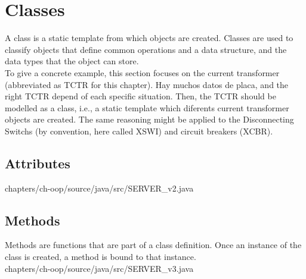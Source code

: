 \section{Classes}

A class is a static 
template from which objects are 
created. Classes are used 
to classify objects  
that define 
common operations 
and a data structure, 
and the data types
that the object can 
store.\\

To give a concrete example, this section 
focuses on the current transformer 
(abbreviated as TCTR 
for this chapter). 
Hay muchos datos de placa, 
and the right {TCTR} depend of 
each specific situation. Then, 
the {TCTR} should be modelled as 
a class, i.e., a static template 
which diferents current transformer objects 
are created. The same reasoning might be 
applied to the Disconnecting Switchs 
(by convention, here called {XSWI})
and circuit breakers ({XCBR}).


%



\subsection{Attributes}
	
	{chapters/ch-oop/source/java/src/SERVER_v2.java}



\subsection{Methods}
Methods are functions that are part of a class 
definition. Once an instance of the class is created, 
a method is bound to that instance.\\
	
	{chapters/ch-oop/source/java/src/SERVER_v3.java}



